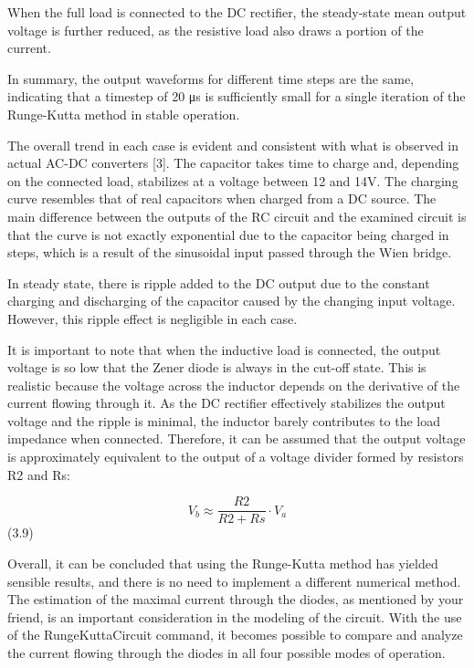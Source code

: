 When the full load is connected to the DC rectifier, the steady-state mean output voltage is further reduced, as the resistive load also draws a portion of the current.

In summary, the output waveforms for different time steps are the same, indicating that a timestep of 20 μs is sufficiently small for a single iteration of the Runge-Kutta method in stable operation.

The overall trend in each case is evident and consistent with what is observed in actual AC-DC converters [3]. The capacitor takes time to charge and, depending on the connected load, stabilizes at a voltage between 12 and 14V. The charging curve resembles that of real capacitors when charged from a DC source. The main difference between the outputs of the RC circuit and the examined circuit is that the curve is not exactly exponential due to the capacitor being charged in steps, which is a result of the sinusoidal input passed through the Wien bridge.

In steady state, there is ripple added to the DC output due to the constant charging and discharging of the capacitor caused by the changing input voltage. However, this ripple effect is negligible in each case.

It is important to note that when the inductive load is connected, the output voltage is so low that the Zener diode is always in the cut-off state. This is realistic because the voltage across the inductor depends on the derivative of the current flowing through it. As the DC rectifier effectively stabilizes the output voltage and the ripple is minimal, the inductor barely contributes to the load impedance when connected. Therefore, it can be assumed that the output voltage is approximately equivalent to the output of a voltage divider formed by resistors R2 and Rs:

\[V_b \approx \frac{R2}{R2 + Rs} \cdot V_a\]   (3.9)

Overall, it can be concluded that using the Runge-Kutta method has yielded sensible results, and there is no need to implement a different numerical method.\\

The estimation of the maximal current through the diodes, as mentioned by your friend, is an important consideration in the modeling of the circuit. With the use of the RungeKuttaCircuit command, it becomes possible to compare and analyze the current flowing through the diodes in all four possible modes of operation.

